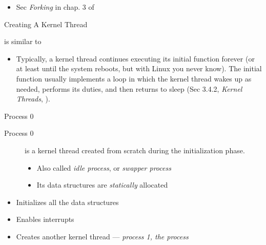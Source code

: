\begin{itemize}
\item Sec \emph{Forking} in chap. 3 of \cite{love2010linux}
\end{itemize}

\begin{frame}{Creating A Kernel Thread}
  \begin{block}{ is similar to }
    \begin{center}
    \end{center}
  \end{block}
\end{frame}

\begin{itemize}
\item Typically, a kernel thread continues executing its initial function forever (or at
  least until the system reboots, but with Linux you never know). The initial function
  usually implements a loop in which the kernel thread wakes up as needed, performs its
  duties, and then returns to sleep (Sec 3.4.2, \emph{Kernel Threads},
  \cite{love2010linux}).
\end{itemize}

\begin{frame}{Process 0}
  \begin{description}
  \item[Process 0] is a kernel thread created from scratch during the initialization
    phase.
    \begin{itemize}
    \item Also called \emph{idle process}, or \emph{swapper process}
    \item Its data structures are \emph{statically} allocated
    \end{itemize}
  \end{description}
  \begin{block}{}
    \begin{itemize}
    \item Initializes all the data structures
    \item Enables interrupts
    \item Creates another kernel thread --- \emph{process 1, the  process}
    \end{itemize}
  \end{block}
\end{frame}

